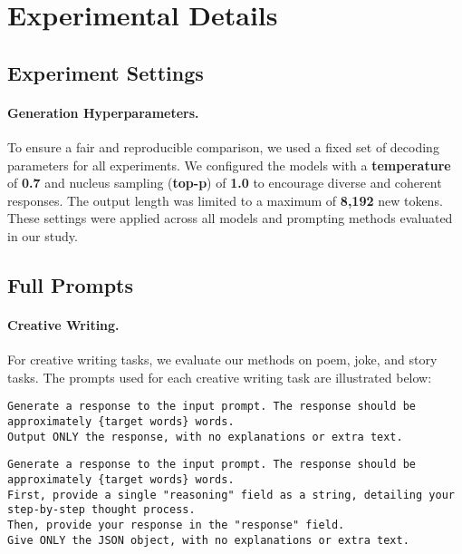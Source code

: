 \section{Experimental Details}

\subsection{Experiment Settings} \label{appendix:experiment_settings}
\paragraph{Generation Hyperparameters.}
To ensure a fair and reproducible comparison, we used a fixed set of decoding parameters for all experiments. We configured the models with a \textbf{temperature} of \textbf{0.7} and nucleus sampling (\textbf{top-p}) of \textbf{1.0} to encourage diverse and coherent responses. The output length was limited to a maximum of \textbf{8,192} new tokens. These settings were applied across all models and prompting methods evaluated in our study.



\subsection{Full Prompts}\label{appendix:experiment_prompt}

\paragraph{Creative Writing.}
For creative writing tasks, we evaluate our methods on poem, joke, and story tasks. The prompts used for each creative writing task are illustrated below:

\begin{tcolorbox}[colback=gray!5!white, colframe=gray!75!black, title=Direct Prompt:]
\small
\texttt{Generate a response to the input prompt. The response should be approximately \{target words\} words.}\\
\texttt{Output ONLY the response, with no explanations or extra text.}
\end{tcolorbox}

\begin{tcolorbox}[colback=gray!5!white, colframe=gray!75!black, title=Direct Prompting with CoT:]
\small
\texttt{Generate a response to the input prompt. The response should be approximately \{target words\} words.} \\

\texttt{First, provide a single "reasoning" field as a string, detailing your step-by-step thought process.} \\
\texttt{Then, provide your response in the "response" field.} \\

\texttt{Give ONLY the JSON object, with no explanations or extra text.}
\end{tcolorbox}

